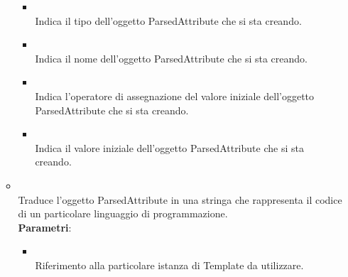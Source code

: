\begin{itemize}
\begin{itemize}
\begin{itemize}
\item {}
\\ Indica il tipo dell'oggetto ParsedAttribute che si sta creando.
\item {}
\\  Indica il nome dell'oggetto ParsedAttribute che si sta creando.
\item {}
\\ Indica l'operatore di assegnazione del valore iniziale dell'oggetto ParsedAttribute che si sta creando.
\item {}
\\ Indica il valore iniziale dell'oggetto ParsedAttribute che si sta creando.
\end{itemize}
\item {}
\\ Traduce l'oggetto ParsedAttribute in una stringa che rappresenta il codice di un particolare linguaggio di programmazione.
\\ \textbf{Parametri}:
\begin{itemize}
\item {}
\\ Riferimento alla particolare istanza di Template da utilizzare.
\end{itemize}
\end{itemize}
\end{itemize}

